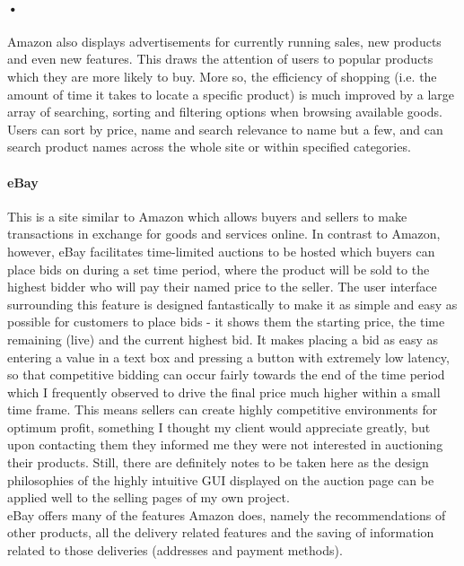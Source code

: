 ﻿\documentclass{article}
\begin{document}
    \paragraph{•}
    Amazon also displays advertisements for currently running sales, new products and even new features.
    This draws the attention of users to popular products which they are more likely to buy.
    More so, the efficiency of shopping (i.e. the amount of time it takes to locate a specific product) is much improved by a large array of searching, sorting and filtering options when browsing available goods.
    Users can sort by price, name and search relevance to name but a few, and can search product names across the whole site or within specified categories.
    
    \paragraph{eBay}
    This is a site similar to Amazon which allows buyers and sellers to make transactions in exchange for goods and services online.
    In contrast to Amazon, however, eBay facilitates time-limited auctions to be hosted which buyers can place bids on during a set time period, where the product will be sold to the highest bidder who will pay their named price to the seller.
    The user interface surrounding this feature is designed fantastically to make it as simple and easy as possible for customers to place bids - it shows them the starting price, the time remaining (live) and the current highest bid.
    It makes placing a bid as easy as entering a value in a text box and pressing a button with extremely low latency, so that competitive bidding can occur fairly towards the end of the time period which I frequently observed to drive the final price much higher within a small time frame.
    This means sellers can create highly competitive environments for optimum profit, something I thought my client would appreciate greatly, but upon contacting them they informed me they were not interested in auctioning their products.
    Still, there are definitely notes to be taken here as the design philosophies of the highly intuitive GUI displayed on the auction page can be applied well to the selling pages of my own project.
    \\
    eBay offers many of the features Amazon does, namely the recommendations of other products, all the delivery related features and the saving of information related to those deliveries (addresses and payment methods).
\end{document}
